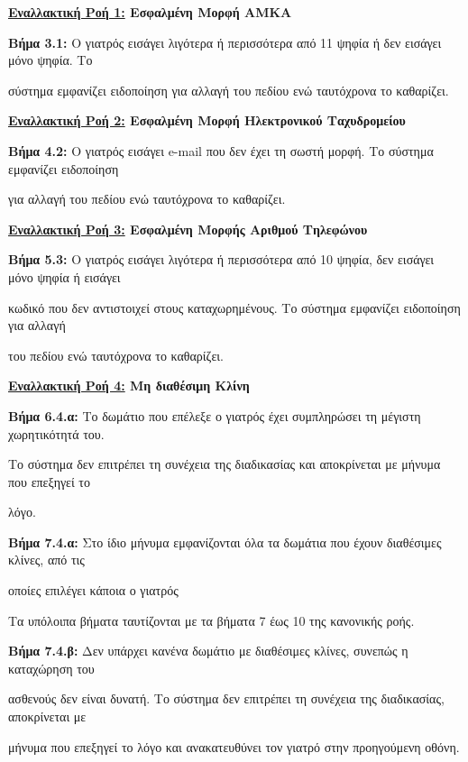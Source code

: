 \documentclass{article}
\begin{document}
\textbf{\underline{Εναλλακτική Ροή 1:} Εσφαλμένη Μορφή ΑΜΚΑ} \vspace{0.2cm}
\par \textbf{Βήμα 3.1:} Ο γιατρός εισάγει λιγότερα ή περισσότερα από 11 ψηφία ή δεν εισάγει μόνο ψηφία. Το \par σύστημα εμφανίζει ειδοποίηση για αλλαγή του πεδίου ενώ ταυτόχρονα το καθαρίζει. \vspace{0.2cm}

\textbf{\underline{Εναλλακτική Ροή 2:} Εσφαλμένη Μορφή Ηλεκτρονικού Ταχυδρομείου} \vspace{0.2cm}
\par \textbf{Βήμα 4.2:} Ο γιατρός εισάγει e-mail που δεν έχει τη σωστή μορφή. Το σύστημα εμφανίζει ειδοποίηση \par για αλλαγή του πεδίου ενώ ταυτόχρονα το καθαρίζει.  \vspace{0.2cm}

\textbf{\underline{Εναλλακτική Ροή 3:} Εσφαλμένη Μορφής Αριθμού Τηλεφώνου} \vspace{0.2cm}
\par \textbf{Βήμα 5.3:} Ο γιατρός εισάγει λιγότερα ή περισσότερα από 10 ψηφία, δεν εισάγει μόνο ψηφία ή εισάγει \par κωδικό που δεν αντιστοιχεί στους καταχωρημένους. Το σύστημα εμφανίζει ειδοποίηση για αλλαγή \par του πεδίου ενώ ταυτόχρονα το καθαρίζει. \vspace{0.2cm}

\textbf{\underline{Εναλλακτική Ροή 4:} Μη διαθέσιμη Κλίνη} \vspace{0.2cm}
\par \textbf{Βήμα 6.4.α:} Το δωμάτιο που επέλεξε ο γιατρός έχει συμπληρώσει τη μέγιστη χωρητικότητά του. \par Το σύστημα δεν επιτρέπει τη συνέχεια της διαδικασίας και αποκρίνεται με μήνυμα που επεξηγεί το \par λόγο. \vspace{0.1cm}
\par \textbf{Βήμα 7.4.α:} Στο ίδιο μήνυμα εμφανίζονται όλα τα δωμάτια που έχουν διαθέσιμες κλίνες, από τις \par οποίες επιλέγει κάποια ο γιατρός \vspace{0.2cm}

Τα υπόλοιπα βήματα ταυτίζονται με τα βήματα 7 έως 10 της κανονικής ροής. \vspace{0.2cm}

\par \textbf{Βήμα 7.4.β:} Δεν υπάρχει κανένα δωμάτιο με διαθέσιμες κλίνες, συνεπώς η καταχώρηση του \par ασθενούς δεν είναι δυνατή. Το σύστημα δεν επιτρέπει τη συνέχεια της διαδικασίας, αποκρίνεται με \par μήνυμα που επεξηγεί το λόγο και ανακατευθύνει τον γιατρό στην προηγούμενη οθόνη. \vspace{0.2cm}
\end{document}
